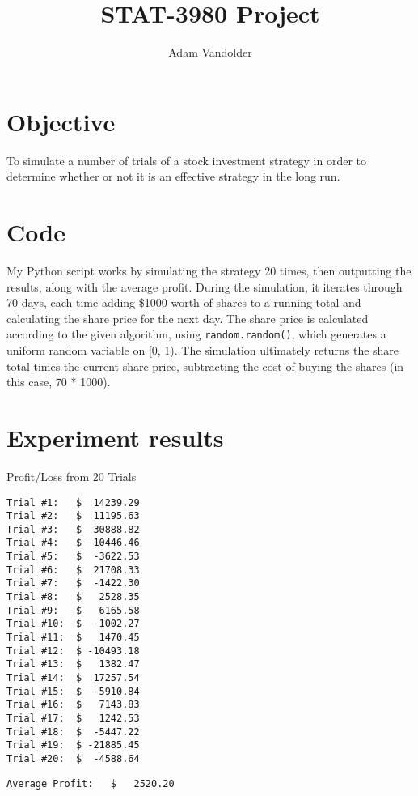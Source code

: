 \documentclass{article}
\title{STAT-3980 Project}
\author{Adam Vandolder}
\begin{document}
    \maketitle

    \section{Objective}
    
    To simulate a number of trials of a stock investment strategy in order to
    determine whether or not it is an effective strategy in the long run.

    \section{Code}
    
    My Python script works by simulating the strategy 20 times, then outputting
    the results, along with the average profit. During the simulation, it
    iterates through 70 days, each time adding \$1000 worth of shares to a
    running total and calculating the share price for the next day.  The share
    price is calculated according to the given algorithm, using
    \texttt{random.random()}, which generates a uniform random variable on [0,
    1).  The simulation ultimately returns the share total times the current
    share price, subtracting the cost of buying the shares (in this case, 70 *
    1000).

    \section{Experiment results}

    Profit/Loss from 20 Trials
    \begin{multicols}{2}
    \begin{verbatim}
Trial #1:   $  14239.29
Trial #2:   $  11195.63
Trial #3:   $  30888.82
Trial #4:   $ -10446.46
Trial #5:   $  -3622.53
Trial #6:   $  21708.33
Trial #7:   $  -1422.30
Trial #8:   $   2528.35
Trial #9:   $   6165.58
Trial #10:  $  -1002.27
Trial #11:  $   1470.45
Trial #12:  $ -10493.18
Trial #13:  $   1382.47
Trial #14:  $  17257.54
Trial #15:  $  -5910.84
Trial #16:  $   7143.83
Trial #17:  $   1242.53
Trial #18:  $  -5447.22
Trial #19:  $ -21885.45
Trial #20:  $  -4588.64
    \end{verbatim}
    \end{multicols}
    \begin{verbatim}
Average Profit:   $   2520.20
    \end{verbatim}
\end{document}

